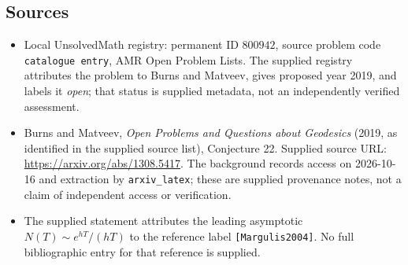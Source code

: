 \documentclass[11pt]{article}
\begin{document}
\subsection{Sources}
\begin{itemize}
\item Local UnsolvedMath registry: permanent ID $800942$, source problem code \texttt{catalogue entry}, AMR Open Problem Lists. The supplied registry attributes the problem to Burns and Matveev, gives proposed year 2019, and labels it \emph{open}; that status is supplied metadata, not an independently verified assessment.
\item Burns and Matveev, \emph{Open Problems and Questions about Geodesics} (2019, as identified in the supplied source list), Conjecture 22. Supplied source URL: \url{https://arxiv.org/abs/1308.5417}. The background records access on 2026-10-16 and extraction by \texttt{arxiv\_latex}; these are supplied provenance notes, not a claim of independent access or verification.
\item The supplied statement attributes the leading asymptotic $N(T)\sim e^{hT}/(hT)$ to the reference label \texttt{[Margulis2004]}. No full bibliographic entry for that reference is supplied.
\end{itemize}
\end{document}
